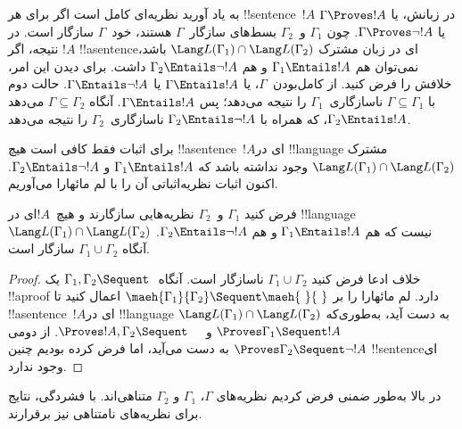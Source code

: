 \documentclass[../../../include/open-logic-section]{subfiles}
\begin{document}
به یاد آورید نظریه‌ای کامل است اگر برای هر !!{sentence}~$!A$ در
زبانش، یا $\Gamma\Proves !A$ یا $\Gamma\Proves\lnot !A$. چون
$\Gamma_1$ و~$\Gamma_2$ بسط‌های سازگار~$\Gamma$ هستند، خود~$\Gamma$
سازگار است. در نتیجه، اگر $!A$ !!a{sentence}‌ای در زبان مشترک
$\Lang L(\Gamma_1)\cap\Lang L(\Gamma_2)$ باشد، نمی‌توان هم
$\Gamma_1\Entails !A$ و هم
$\Gamma_2\Entails\lnot !A$ داشت. برای دیدن این امر، خلافش را فرض
کنید. از کامل‌بودن~$\Gamma$، یا $\Gamma\Entails !A$ یا
$\Gamma\Entails\lnot !A$. حالت دوم با
$\Gamma\subseteq\Gamma_1$ ناسازگاری~$\Gamma_1$ را نتیجه می‌دهد؛ پس
$\Gamma\Entails !A$. آنگاه $\Gamma\subseteq\Gamma_2$ می‌دهد
$\Gamma_2\Entails !A$، که همراه با
$\Gamma_2\Entails\lnot !A$ ناسازگاری~$\Gamma_2$ را نتیجه می‌دهد.

برای اثبات فقط کافی است هیچ !!a{sentence}~$!A$ای در
!!{language} مشترک
$\Lang L(\Gamma_1)\cap\Lang L(\Gamma_2)$ وجود نداشته باشد که
$\Gamma_1\Entails !A$ و $\Gamma_2\Entails\lnot !A$. اکنون اثبات
نظریه‌اثباتی آن را با لم مائهارا می‌آوریم.

\begin{thm}
فرض کنید $\Gamma_1$ و~$\Gamma_2$ نظریه‌هایی سازگارند و هیچ~$!A$ای در
!!{language}
$\Lang L(\Gamma_1)\cap\Lang L(\Gamma_2)$ نیست که هم
$\Gamma_1\Entails !A$ و هم $\Gamma_2\Entails\lnot !A$. آنگاه
$\Gamma_1\cup\Gamma_2$ سازگار است.
\end{thm}

\begin{proof}
خلاف ادعا فرض کنید $\Gamma_1\cup\Gamma_2$ ناسازگار است. آنگاه
$\Gamma_1,\Gamma_2\Sequent\ $ یک !!a{proof} دارد. لم مائهارا را بر
$\maeh{\Gamma_1}{\Gamma_2}\Sequent\maeh{\ }{\ }$ اعمال کنید تا
!!a{sentence}~$!A$ای در !!{language}
$\Lang L(\Gamma_1)\cap\Lang L(\Gamma_2)$ به دست آید، به‌طوری‌که
$\Proves\Gamma_1\Sequent !A$ و
$\Proves !A,\Gamma_2\Sequent\quad$. از دومی
$\Proves\Gamma_2\Sequent\lnot !A$ به دست می‌آید، اما فرض کرده بودیم
چنین !!{sentence}‌ای وجود ندارد.
\end{proof}

در بالا به‌طور ضمنی فرض کردیم نظریه‌های $\Gamma$، $\Gamma_1$ و
$\Gamma_2$ متناهی‌اند. با فشردگی، نتایج برای نظریه‌های نامتناهی نیز
برقرارند.
\end{document}
